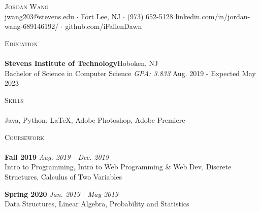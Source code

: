 \documentclass[10pt]{article}
\newcommand{\lineunder} {
    \vspace*{-8pt} \\
    \hspace*{-18pt} \hrulefill \\
}
\newcommand{\header} [1] {
    {\hspace*{-18pt}\vspace*{6pt} \textsc{#1}}
    \vspace*{-6pt} \lineunder
}
\begin{document}
\vspace*{-40pt}

    

\vspace*{2pt}
\begin{center}
	{\Huge \scshape {Jordan Wang}}\\
	jwang203@stevens.edu $\cdot$ Fort Lee, NJ $\cdot$ (973) 652-5128 linkedin.com/in/jordan-wang-689146192/ $\cdot$ github.com/iFallenDawn \\
\end{center}

\header{Education}
\textbf{Stevens Institute of Technology}\hfill Hoboken, NJ\\
Bachelor of Science in Computer Science \textit{GPA: 3.833} \hfill Aug. 2019 - Expected May 2023\\
\vspace{2mm}

\header{Skills}
	Java, Python, \LaTeX, Adobe Photoshop, Adobe Premiere                    \\
\vspace{2mm}

\header{Coursework}
{\textbf{Fall 2019}} {\sl Aug. 2019 - Dec. 2019} \hfill 
\\
Intro to Programming, Intro to Web Programming \& Web Dev, Discrete Structures, Calculus of Two Variables\\
\vspace*{2mm}

{\textbf{Spring 2020}} {\sl Jan. 2019 - May 2019} \hfill 
\\
Data Structures, Linear Algebra, Probability and Statistics\\
\vspace*{2mm}
\ 
\end{document}
